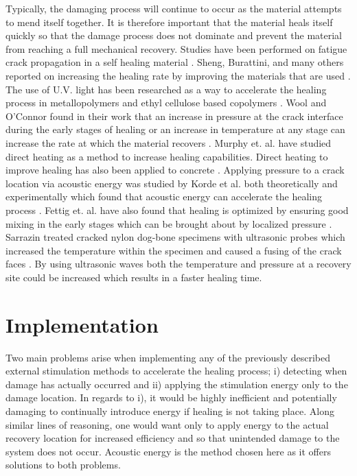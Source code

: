 Typically, the damaging process will continue to occur as the material attempts to mend itself together. It is therefore important that the material heals itself quickly so that the damage process does not dominate and prevent the material from reaching a full mechanical recovery. Studies have been performed on fatigue crack propagation in a self healing material \cite{Brown2003}. Sheng, Burattini, and many others reported on increasing the healing rate by improving the materials that are used \cite{Sheng2009, Burattini2009, Nakao2009, Imperiale2009, Zhang2007}. The use of U.V. light has been researched as a way to accelerate the healing process in metallopolymers and ethyl cellulose based copolymers \cite{Tang2009, Burnworth2009}. Wool and O'Connor found in their work that an increase in pressure at the crack interface during the early stages of healing or an increase in temperature at any stage can increase the rate at which the material recovers \cite{Wool1981}. Murphy et. al. have studied direct heating as a method to increase healing capabilities\cite{Murphy2009}. Direct heating to improve healing has also been applied to concrete \cite{Garcia2009, Nishiwaki2009}. Applying pressure to a crack location via acoustic energy was studied by Korde et al. both theoretically and experimentally which found that acoustic energy can accelerate the healing process \cite{Sarrazin2009, Cushman2012, Barnes2009}. Fettig et. al. have also found that healing is optimized by ensuring good mixing in the early stages which can be brought about by localized pressure \cite{Fettig2009}. Sarrazin treated cracked nylon dog-bone specimens with ultrasonic probes which increased the temperature within the specimen and caused a fusing of the crack faces  \cite{Sarrazin2-2009}. By using ultrasonic waves both the temperature and pressure at a recovery site could be increased which results in a faster healing time.

\section{Implementation}

Two main problems arise when implementing any of the previously described external stimulation methods to accelerate the healing process; i) detecting when damage has actually occurred and ii) applying the stimulation energy only to the damage location. In regards to i), it would be highly inefficient and potentially damaging to continually introduce energy if healing is not taking place. Along similar lines of reasoning, one would want only to apply energy to the actual recovery location for increased efficiency and so that unintended damage to the system does not occur. Acoustic energy is the method chosen here as it offers solutions to both problems. 


